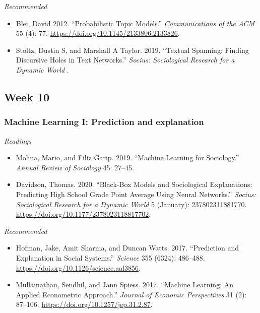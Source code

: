 \documentclass[
  10pt,
]{article}
\providecommand{\tightlist}{%
  \setlength{\itemsep}{0pt}\setlength{\parskip}{0pt}}
\begin{document}
\emph{Recommended}

\begin{itemize}
\tightlist
\item
  Blei, David 2012. ``Probabilistic Topic Models.'' \emph{Communications
  of the ACM} 55 (4): 77. \url{https://doi.org/10.1145/2133806.2133826}.
\item
  Stoltz, Dustin S, and Marshall A Taylor. 2019. ``Textual Spanning:
  Finding Discursive Holes in Text Networks.'' \emph{Socius:
  Sociological Research for a Dynamic World} .
\end{itemize}

\hypertarget{week-10}{%
\subsection{Week 10}\label{week-10}}

\hypertarget{machine-learning-i-prediction-and-explanation}{%
\subsubsection{Machine Learning I: Prediction and
explanation}\label{machine-learning-i-prediction-and-explanation}}

\emph{Readings}

\begin{itemize}
\tightlist
\item
  Molina, Mario, and Filiz Garip. 2019. ``Machine Learning for
  Sociology.'' \emph{Annual Review of Sociology} 45: 27--45.
\item
  Davidson, Thomas. 2020. ``Black-Box Models and Sociological
  Explanations: Predicting High School Grade Point Average Using Neural
  Networks.'' \emph{Socius: Sociological Research for a Dynamic World} 5
  (January): 237802311881770.
  \url{https://doi.org/10.1177/2378023118817702}.
\end{itemize}

\emph{Recommended}

\begin{itemize}
\tightlist
\item
  Hofman, Jake, Amit Sharma, and Duncan Watts. 2017. ``Prediction and
  Explanation in Social Systems.'' \emph{Science} 355 (6324): 486--488.
  \url{https://doi.org/10.1126/science.aal3856}.
\item
  Mullainathan, Sendhil, and Jann Spiess. 2017. ``Machine Learning: An
  Applied Econometric Approach.'' \emph{Journal of Economic
  Perspectives} 31 (2): 87--106.
  \url{https://doi.org/10.1257/jep.31.2.87}.
\end{itemize}
\end{document}
